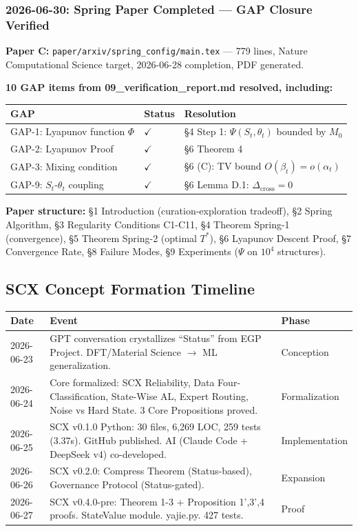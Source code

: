 \documentclass[12pt]{article}
\begin{document}
\subsubsection{2026-06-30: Spring Paper Completed --- GAP Closure Verified}
\textbf{Paper C:} \texttt{paper/arxiv/spring\_config/main.tex} --- 779 lines, Nature Computational Science target, 2026-06-28 completion, PDF generated.\par
\textbf{10 GAP items from 09\_verification\_report.md resolved, including:}
\begin{longtable}{@{}p{} p{} p{}@{}}
\toprule GAP & Status & Resolution \\
\midrule
GAP-1: Lyapunov function \(\Phi\) & \(\checkmark\) & \S4 Step 1: \(\Psi(S_t, \theta_t)\) bounded by \(M_0\) \\
GAP-2: Lyapunov Proof & \(\checkmark\) & \S6 Theorem 4 \\
GAP-3: Mixing condition & \(\checkmark\) & \S6 (C): TV bound \(O(\beta_t) = o(\alpha_t)\) \\
GAP-9: \(S_t\)-\(\theta_t\) coupling & \(\checkmark\) & \S6 Lemma D.1: \(\Delta_{\text{cross}} = 0\) \\
\bottomrule
\end{longtable}

\textbf{Paper structure:} \S1 Introduction (curation-exploration tradeoff), \S2 Spring Algorithm, \S3 Regularity Conditions C1-C11, \S4 Theorem Spring-1 (convergence), \S5 Theorem Spring-2 (optimal \(T^*\)), \S6 Lyapunov Descent Proof, \S7 Convergence Rate, \S8 Failure Modes, \S9 Experiments (\(\Psi\) on \(10^4\) structures).

\subsection{SCX Concept Formation Timeline}
\begin{longtable}{@{}p{} p{} p{}@{}}
\toprule Date & Event & Phase \\
\midrule
2026-06-23 & GPT conversation crystallizes ``Status'' from EGP Project. DFT/Material Science \(\to\) ML generalization. & Conception \\
2026-06-24 & Core formalized: SCX Reliability, Data Four-Classification, State-Wise AL, Expert Routing, Noise vs Hard State. 3 Core Propositions proved. & Formalization \\
2026-06-25 & SCX v0.1.0 Python: 30 files, 6,269 LOC, 259 tests (3.37s). GitHub published. AI (Claude Code + DeepSeek v4) co-developed. & Implementation \\
2026-06-26 & SCX v0.2.0: Compress Theorem (Status-based), Governance Protocol (Status-gated). & Expansion \\
2026-06-27 & SCX v0.4.0-pre: Theorem 1-3 + Proposition 1',3',4 proofs. StateValue module. yajie.py. 427 tests. & Proof \\
\bottomrule
\end{longtable}
\end{document}

